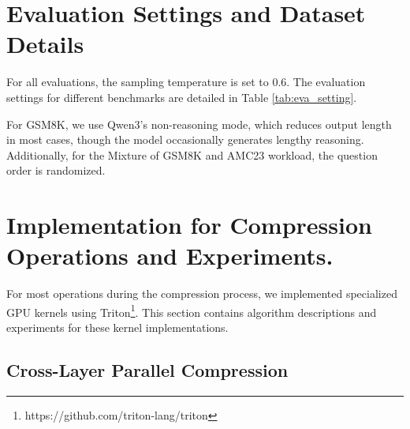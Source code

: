 \documentclass[11pt]{article}
\begin{document}
\section{Evaluation Settings and Dataset Details}
\label{sct:eval_data}

For all evaluations, the sampling temperature is set to 0.6. The evaluation settings for different benchmarks are detailed in Table \ref{tab:eva_setting}.

\begin{table}[!h]
\centering
{}
\caption{Evaluation settings for different workloads or benchmarks.}
\label{tab:eva_setting}
\end{table}

For GSM8K, we use Qwen3's non-reasoning mode, which reduces output length in most cases, though the model occasionally generates lengthy reasoning. Additionally, for the Mixture of GSM8K and AMC23 workload, the question order is randomized.

\section{Implementation for Compression Operations and Experiments.}

For most operations during the compression process, we implemented specialized GPU kernels using Triton\footnote{https://github.com/triton-lang/triton}. This section contains algorithm descriptions and experiments for these kernel implementations.

\subsection{Cross-Layer Parallel Compression}
\end{document}
